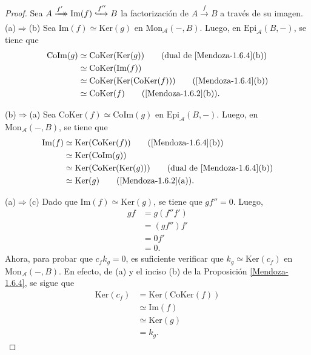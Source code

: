 \documentclass[tesis]{subfiles}
\begin{document}
\begin{proof}
    Sea $A\xrightarrow[]{f'}\mathrel{\mkern-14mu}\rightarrow \text{Im}(f)\xhookrightarrow{f''} B$ la factorización de $A\xrightarrow[]{f}B$ a través de su imagen. \\

    (a)$\Rightarrow$(b) Sea $\text{Im}(f)\simeq\text{Ker}(g)$ en $\text{Mon}_\mathscr{A}(-,B)$. Luego, en $\text{Epi}_\mathscr{A}(B,-)$, se tiene que
    \begin{align*}
        \text{CoIm}(g) &\simeq \text{CoKer}(\text{Ker}(g)) \tag{dual de \ref{Mendoza-1.6.4}(b)} \\
                       &\simeq \text{CoKer}(\text{Im}(f)) \\
                       &\simeq \text{CoKer}(\text{Ker}(\text{CoKer}(f))) \tag{\ref{Mendoza-1.6.4}(b)} \\
                       &\simeq \text{CoKer}(f) \tag{\ref{Mendoza-1.6.2}(b)}.
    \end{align*}

    (b)$\Rightarrow$(a) Sea $\text{CoKer}(f)\simeq\text{CoIm}(g)$ en $\text{Epi}_\mathscr{A}(B,-)$. Luego, en $\text{Mon}_\mathscr{A}(-,B)$, se tiene que
    \begin{align*}
        \text{Im}(f) &\simeq \text{Ker}(\text{CoKer}(f)) \tag{\ref{Mendoza-1.6.4}(b)} \\
                       &\simeq \text{Ker}(\text{CoIm}(g)) \\
                       &\simeq \text{Ker}(\text{CoKer}(\text{Ker}(g))) \tag{dual de \ref{Mendoza-1.6.4}(b)} \\
                       &\simeq \text{Ker}(g) \tag{\ref{Mendoza-1.6.2}(a)}.
    \end{align*}

    (a)$\Rightarrow$(c) Dado que $\text{Im}(f)\simeq\text{Ker}(g)$, se tiene que $gf''=0$. Luego,
    \begin{align*}
        gf &= g(f''f') \\
           &= (gf'')f' \\
           &= 0f' \\
           &= 0.
    \end{align*}
    Ahora, para probar que $c_fk_g=0$, es suficiente verificar que $k_g\simeq\text{Ker}(c_f)$ en $\text{Mon}_\mathscr{A}(-,B)$. En efecto, de (a) y el inciso (b) de la Proposición \ref{Mendoza-1.6.4}, se sigue que
    \begin{align*}
        \text{Ker}(c_f) &= \text{Ker}(\text{CoKer}(f)) \\
                        &\simeq \text{Im}(f) \\
                        &\simeq \text{Ker}(g) \\
                        &= k_g.
    \end{align*}
    

\end{proof}
\end{document}
